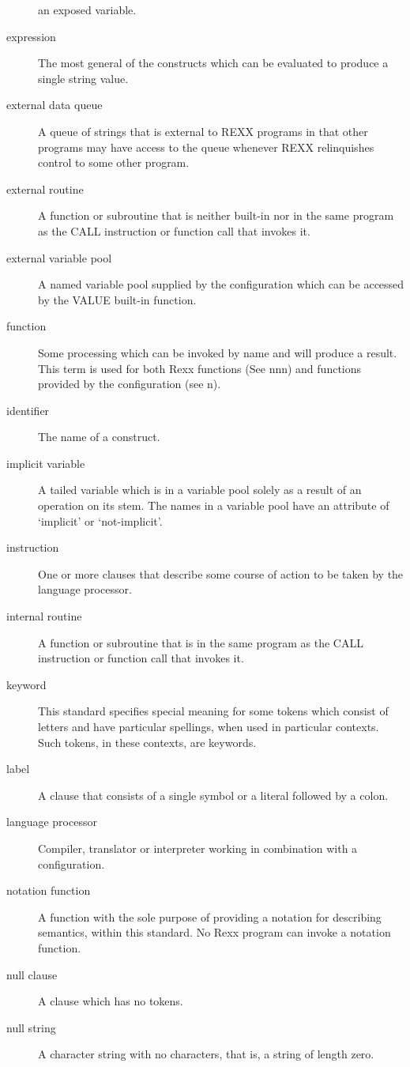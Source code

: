 \begin{description}
an exposed variable.
\item[expression]
The most general of the constructs which can be evaluated to produce a
single string value.
\item[external data queue]
A queue of strings that is external to REXX programs in that other
programs may have access to the queue whenever REXX relinquishes control
to some other program.
\item[external routine]
A function or subroutine that is neither built-in nor in the same
program as the CALL instruction or function call that invokes it.
\item[external variable pool]
A named variable pool supplied by the configuration which can be
accessed by the VALUE built-in function.
\item[function]
Some processing which can be invoked by name and will produce a result.
This term is used for both Rexx functions (See nnn) and functions
provided by the configuration (see n).
\item[identifier]
The name of a construct.
\item[implicit variable]
A tailed variable which is in a variable pool solely as a result of an
operation on its stem. The names in a variable pool have an attribute of
`implicit' or `not-implicit'.
\item[instruction]
One or more clauses that describe some course of action to be taken by
the language processor.
\item[internal routine]
A function or subroutine that is in the same program as the CALL
instruction or function call that invokes it.
\item[keyword]
This standard specifies special meaning for some tokens which consist of
letters and have particular spellings, when used in particular contexts.
Such tokens, in these contexts, are keywords.
\item[label]
A clause that consists of a single symbol or a literal followed by a
colon.
\item[language processor]
Compiler, translator or interpreter working in combination with a
configuration.
\item[notation function]
A function with the sole purpose of providing a notation for describing
semantics, within this standard. No Rexx program can invoke a notation
function.
\item[null clause]
A clause which has no tokens.
\item[null string]
A character string with no characters, that is, a string of length zero.

\end{description}
